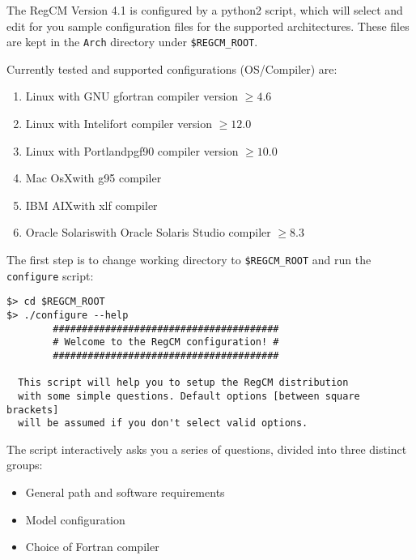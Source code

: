 The RegCM Version 4.1 is configured by a python2 script, which will select
and edit for you sample configuration files for the supported architectures.
These files are kept in the \verb=Arch= directory under \verb=$REGCM_ROOT=.

Currently tested and supported configurations (OS/Compiler) are:

\begin{enumerate}
\item Linux with GNU gfortran compiler version $\ge 4.6$
\item Linux with Intel\texttrademark ifort compiler version $\ge 12.0$
\item Linux with Portland\texttrademark pgf90 compiler version $\ge 10.0$
\item Mac OsX\texttrademark with g95 compiler
\item IBM AIX\texttrademark with xlf compiler
\item Oracle Solaris\texttrademark with Oracle Solaris Studio\texttrademark
compiler $\ge 8.3$
\end{enumerate}

The first step is to change working directory to \verb=$REGCM_ROOT= and run the
\verb=configure= script:

\begin{Verbatim}
$> cd $REGCM_ROOT
$> ./configure --help
        #######################################
        # Welcome to the RegCM configuration! #
        #######################################

  This script will help you to setup the RegCM distribution
  with some simple questions. Default options [between square brackets] 
  will be assumed if you don't select valid options.
\end{Verbatim}

The script interactively asks you a series of questions, divided into three
distinct groups:
\begin{itemize}
\item General path and software requirements
\item Model configuration
\item Choice of Fortran compiler
\end{itemize}

